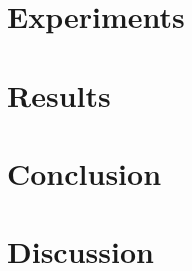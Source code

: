 \documentclass[a4paper]{article}
\begin{document}
\section{Experiments}
\label{sec:experiments}
\section{Results}
\label{sec:results}
\section{Conclusion}
\label{sec:conclusion}
\section{Discussion}
\label{sec:discussion}



\end{document}
